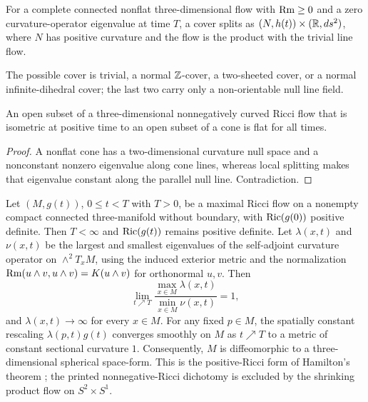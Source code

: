 \begin{corollary}
\label{cor:global-product-splitting-cover}
\label{nullspace}
For a complete connected nonflat three-dimensional flow with $\operatorname{Rm}\ge0$ and a
zero curvature-operator eigenvalue at time $T$, a cover splits as
$(N,h(t))\times(\mathbb{R},ds^2)$, where $N$ has positive curvature and the flow is
the product with the trivial line flow.
\end{corollary}
\begin{remark}
\label{rem:product-splitting-cover-classification}

The possible cover is trivial, a normal $\mathbb{Z}$-cover, a two-sheeted cover, or
a normal infinite-dihedral cover; the last two carry only a non-orientable
null line field.
\end{remark}

\begin{proposition}
\label{prop:no-nonflat-cones-from-ricci-flow}
\label{nocones}
An open subset of a three-dimensional nonnegatively curved Ricci flow that is
isometric at positive time to an open subset of a cone is flat for all times.
\end{proposition}
\begin{proof}
\sketch A nonflat cone has a two-dimensional curvature null space and a
nonconstant nonzero eigenvalue along cone lines, whereas local splitting makes
that eigenvalue constant along the parallel null line. Contradiction.
\end{proof}

\begin{theorem}
\label{thm:nonnegative-ricci-flow-becomes-round}
\label{flowtoround}
Let $(M,g(t))$, $0\le t<T$ with $T>0$, be a maximal Ricci flow on a nonempty compact
connected three-manifold without boundary, with $\operatorname{Ric}(g(0))$ positive
definite. Then $T<\infty$ and $\operatorname{Ric}(g(t))$ remains positive definite.
Let $\lambda(x,t)$ and $\nu(x,t)$ be the largest and smallest eigenvalues
of the self-adjoint curvature operator on $\wedge^2T_xM$, using the induced
exterior metric and the normalization
$\operatorname{Rm}(u\wedge v,u\wedge v)=K(u\wedge v)$ for orthonormal $u,v$. Then
\[
\lim_{t\nearrow T}\frac{\max_{x\in M}\lambda(x,t)}{\min_{x\in M}\nu(x,t)}=1,
\]
and $\lambda(x,t)\to\infty$ for every $x\in M$. For any fixed $p\in M$,
the spatially constant rescaling $\lambda(p,t)g(t)$ converges smoothly on
$M$ as $t\nearrow T$ to a metric of constant sectional curvature $1$.
Consequently, $M$ is diffeomorphic to a three-dimensional spherical
space-form. This is the positive-Ricci form of Hamilton's theorem
\cite{Hamilton3MPRC}; the printed nonnegative-Ricci dichotomy is excluded
by the shrinking product flow on $S^2\times S^1$.
\end{theorem}

